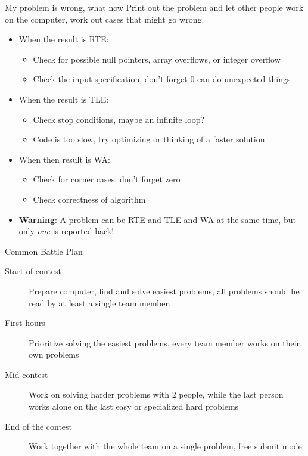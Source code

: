 \documentclass[11pt,pdf, aspectratio=169]{beamer}
\begin{document}
  \begin{frame}{My problem is wrong, what now}
    Print out the problem and let other people work on the computer, work out cases that might go wrong.
    \begin{itemize}
      \item When the result is RTE:
      \begin{itemize}
        \item Check for possible null pointers, array overflows, or integer overflow
        \item Check the input specification, don't forget 0 can do unexpected things
      \end{itemize}
      \item When the result is TLE:
      \begin{itemize}
        \item Check stop conditions, maybe an infinite loop?
        \item Code is too slow, try optimizing or thinking of a faster solution
      \end{itemize}
      \item When then result is WA:
      \begin{itemize}
        \item Check for corner cases, don't forget zero
        \item Check correctness of algorithm
      \end{itemize}
      \item \textbf{Warning}: A problem can be RTE and TLE and WA at the same time, but only \emph{one} is reported back!
    \end{itemize}
  \end{frame}
  \begin{frame}{Common Battle Plan}
    \begin{description}
      \item[Start of contest] Prepare computer, find and solve easiest problems, all problems should be read by at least a single team member.
      \item[First hours] Prioritize solving the easiest problems, every team member works on their own problems
      \item[Mid contest] Work on solving harder problems with 2 people, while the last person works alone on the last easy or specialized hard problems
      \item[End of the contest] Work together with the whole team on a single problem, free submit mode
    \end{description}
  \end{frame}
\end{document}
